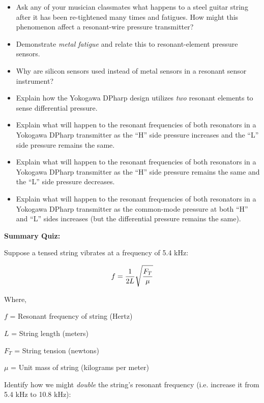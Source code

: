 \begin{itemize}
\item{} Ask any of your musician classmates what happens to a steel guitar string after it has been re-tightened many times and fatigues.  How might this phenomenon affect a resonant-wire pressure transmitter?
\item{} Demonstrate {\it metal fatigue} and relate this to resonant-element pressure sensors.
\item{} Why are silicon sensors used instead of metal sensors in a resonant sensor instrument?
\item{} Explain how the Yokogawa DPharp design utilizes {\it two} resonant elements to sense differential pressure. 
\item{} Explain what will happen to the resonant frequencies of both resonators in a Yokogawa DPharp transmitter as the ``H'' side pressure increases and the ``L'' side pressure remains the same.
\item{} Explain what will happen to the resonant frequencies of both resonators in a Yokogawa DPharp transmitter as the ``H'' side pressure remains the same and the ``L'' side pressure decreases.
\item{} Explain what will happen to the resonant frequencies of both resonators in a Yokogawa DPharp transmitter as the common-mode pressure at both ``H'' and ``L'' sides increases (but the differential pressure remains the same).
\end{itemize}












\vfil \eject

\noindent
{\bf Summary Quiz:}

\vskip 10pt

Suppose a tensed string vibrates at a frequency of 5.4 kHz:

$$f = {1 \over 2L} \sqrt{F_T \over \mu}$$

\noindent
Where,

$f$ = Resonant frequency of string (Hertz)

$L$ = String length (meters)

$F_T$ = String tension (newtons)

$\mu$ = Unit mass of string (kilograms per meter)

\vskip 10pt

\noindent
Identify how we might {\it double} the string's resonant frequency (i.e. increase it from 5.4 kHz to 10.8 kHz):

